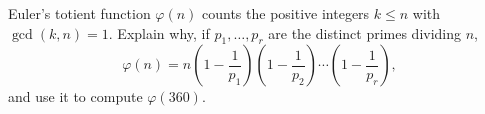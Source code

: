 Euler's totient function $\varphi(n)$ counts the positive integers $k\le n$ with $\gcd(k,n)=1$. Explain why, if $p_1,\dots,p_r$ are the distinct primes dividing $n$,
\[\varphi(n)=n\left(1-\dfrac{1}{p_1}\right)\left(1-\dfrac{1}{p_2}\right)\cdots\left(1-\dfrac{1}{p_r}\right),\]
and use it to compute $\varphi(360)$.
